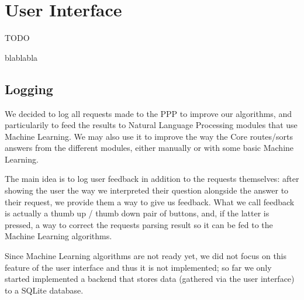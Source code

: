 \section{User Interface}

TODO

blablabla

\subsection{Logging}

We decided to log all requests made to the PPP to improve our algorithms,
and particularily to feed the results to Natural Language Processing
modules that use Machine Learning.
We may also use it to improve the way the Core routes/sorts answers
from the different modules, either manually or with some basic
Machine Learning.

The main idea is to log user feedback in addition to the requests
themselves: after showing the user the way we interpreted their
question alongside the answer to their request, we provide them a
way to give us feedback.
What we call feedback is actually a thumb up / thumb down pair of
buttons, and, if the latter is pressed, a way to correct the requests
parsing result so it can be fed to the Machine Learning algorithms.

Since Machine Learning algorithms are not ready yet, we did not focus
on this feature of the user interface and thus it is not implemented;
so far we only started implemented a backend that stores data
(gathered via the user interface) to a SQLite database.
